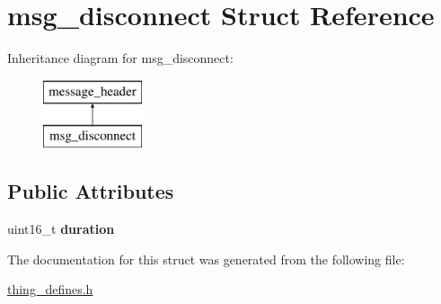 \hypertarget{structmsg__disconnect}{\section{msg\-\_\-disconnect Struct Reference}
\label{structmsg__disconnect}
}
Inheritance diagram for msg\-\_\-disconnect\-:\begin{figure}[H]
\begin{center}
\leavevmode
\includegraphics[height=2.000000cm]{structmsg__disconnect}
\end{center}
\end{figure}
\subsection*{Public Attributes}
\begin{DoxyCompactItemize}
\item 
\hypertarget{structmsg__disconnect_a242651c3b5beda3022d26cd6bf12dc49}{uint16\-\_\-t {\bfseries duration}}\label{structmsg__disconnect_a242651c3b5beda3022d26cd6bf12dc49}

\end{DoxyCompactItemize}


The documentation for this struct was generated from the following file\-:\begin{DoxyCompactItemize}
\item 
\hyperlink{thing__defines_8h}{thing\-\_\-defines.\-h}\end{DoxyCompactItemize}
